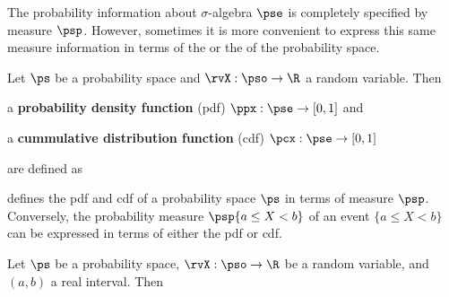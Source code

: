 The probability information about $\sigma$-algebra $\pse$ is completely
specified by measure $\psp$.
However, sometimes it is more convenient to express this same measure
information in terms of the  or the
 of the probability space.
\begin{definition}
\label{def:pdf}
\label{def:cdf}
Let $\ps$ be a probability space and
$\rvX:\pso\to\R$ a random variable. Then
\begin{liste}
  \item a {\bf probability density function} (pdf)      $\ppx:\pse\to[0,1]$ and
   \item a {\bf cummulative distribution function} (cdf) $\pcx:\pse\to[0,1]$
\end{liste}
are defined as
\end{definition}

 defines the pdf and cdf of a probability space
$\ps$ in terms of measure $\psp$.
Conversely, the probability measure $\psp\{a\le X<b\}$
of an event $\{a\le X<b\}$ can be
expressed in terms of either the pdf or cdf.
\begin{theorem}
Let $\ps$ be a probability space,
$\rvX:\pso\to\R$ be a random variable, and $(a,b)$ a real interval.
Then
\end{theorem}

